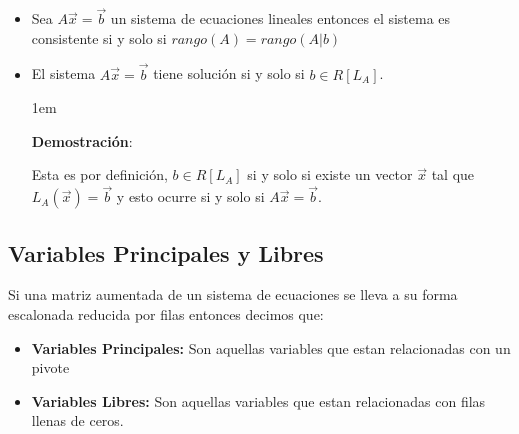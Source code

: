 \documentclass[12pt, fleqn]{report}                             %
\newenvironment{SmallIndentation}[1][0.75em]                    %
        {\begin{adjustwidth}{#1}{}\begin{footnotesize}}             %
        {\end{footnotesize}\end{adjustwidth}}                       %
\theoremstyle{break}                                            %
\begin{document}
                \begin{itemize}
                    \item 
                        Sea $A \vec x = \vec b$ un sistema de ecuaciones lineales
                        entonces el sistema es consistente si y solo si 
                        $rango(A) = rango(A | b)$


                    \item
                        El sistema $A \vec x = \vec b$ tiene solución si y solo si $b \in R[L_A]$.

                        \begin{SmallIndentation}[1em]
                            \textbf{Demostración}:
                            
                            Esta es por definición, $b \in R[L_A]$ si y solo si existe un vector
                            $\vec x$ tal que $L_A(\vec x) = \vec b$ y esto ocurre si y solo si
                            $A \vec x = \vec b$.

                        \end{SmallIndentation}
                            
                \end{itemize}



            
            \clearpage
            \subsection{Variables Principales y Libres}

                Si una matriz aumentada de un sistema de ecuaciones
                se lleva a su forma escalonada reducida por filas
                entonces decimos que:

                \begin{itemize}
                    \item \textbf{Variables Principales:}
                        Son aquellas variables que estan relacionadas
                        con un pivote
                    \item \textbf{Variables Libres:}
                        Son aquellas variables que estan relacionadas
                        con filas llenas de ceros.
                \end{itemize}
\end{document}
